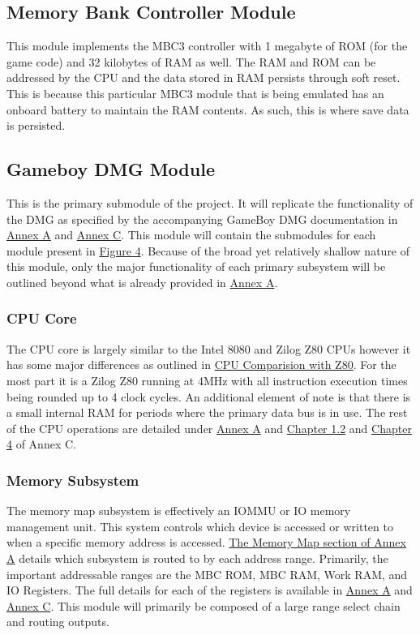\documentclass[12pt,letterpaper,titlepage, final]{report}
\begin{document}
\begin{raggedright}
\subsection{Memory Bank Controller Module}

This module implements the MBC3 controller with 1 megabyte of ROM (for the game code) and 32 kilobytes of RAM as well. The RAM and ROM can be addressed by the CPU and the data stored in RAM persists through soft reset. This is because this particular MBC3 module that is being emulated has an onboard battery to maintain the RAM contents. As such, this is where save data is persisted.

\subsection{Gameboy DMG Module}

This is the primary submodule of the project. It will replicate the functionality of the DMG as specified by the accompanying GameBoy DMG documentation in \hyperlink{annexa}{Annex A} and \hyperlink{annexc}{Annex C}. This module will contain the submodules for each module present in \hyperlink{fig4}{Figure 4}. Because of the broad yet relatively shallow nature of this module, only the major functionality of each primary subsystem will be outlined beyond what is already provided in \hyperlink{annexa}{Annex A}.

\subsubsection{CPU Core}

The CPU core is largely similar to the Intel 8080 and Zilog Z80 CPUs however it has some major differences as outlined in \hyperlink{cpucomp}{CPU Comparision with Z80}. For the most part it is a Zilog Z80 running at 4MHz with all instruction execution times being rounded up to 4 clock cycles. An additional element of note is that there is a small internal RAM for periods where the primary data bus is in use. The rest of the CPU operations are detailed under \hyperlink{annexa}{Annex A} and \hyperlink{page.28}{Chapter 1.2} and \hyperlink{page.103}{Chapter 4} of Annex C.

\subsubsection{Memory Subsystem}

The memory map subsystem is effectively an IOMMU or IO memory management unit. This system controls which device is accessed or written to when a specific memory address is accessed. \hyperlink{memmap}{The Memory Map section of Annex A} details which subsystem is routed to by each address range. Primarily, the important addressable ranges are the MBC ROM, MBC RAM, Work RAM, and IO Registers. The full details for each of the registers is available in \hyperlink{annexa}{Annex A} and \hyperlink{annexc}{Annex C}. This module will primarily be composed of a large range select chain and routing outputs.


\end{raggedright}
\end{document}

